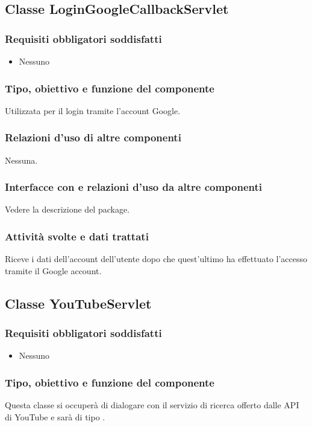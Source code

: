 \subsection{Classe LoginGoogleCallbackServlet}
\subsubsection*{Requisiti obbligatori soddisfatti}
\begin{itemize}
    \item Nessuno
\end{itemize}
\subsubsection*{Tipo, obiettivo e funzione del componente}
Utilizzata per il login tramite l'account Google.
\subsubsection*{Relazioni d'uso di altre componenti}
Nessuna.
\subsubsection*{Interfacce con e relazioni d'uso da altre componenti}
Vedere la descrizione del package.
\subsubsection*{Attivit\`a svolte e dati trattati}
Riceve i dati dell'account dell'utente dopo che quest'ultimo ha effettuato
l'accesso tramite il Google account.

\subsection{Classe YouTubeServlet}
\subsubsection*{Requisiti obbligatori soddisfatti}
\begin{itemize}
    \item Nessuno
\end{itemize}
\subsubsection*{Tipo, obiettivo e funzione del componente}
Questa classe si occuper\`a di dialogare con il servizio di ricerca offerto
dalle API di YouTube e sar\`a di tipo .
